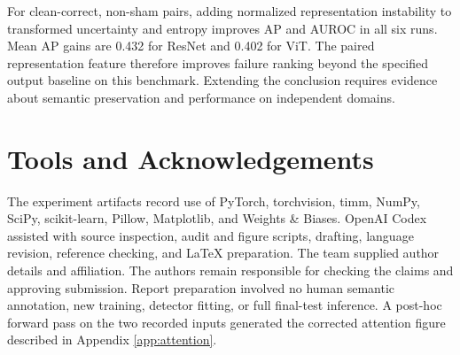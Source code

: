 For clean-correct, non-sham pairs, adding normalized representation instability to transformed uncertainty and entropy improves AP and AUROC in all six runs. Mean AP gains are 0.432 for ResNet and 0.402 for ViT. The paired representation feature therefore improves failure ranking beyond the specified output baseline on this benchmark. Extending the conclusion requires evidence about semantic preservation and performance on independent domains.

\section{Tools and Acknowledgements}

The experiment artifacts record use of PyTorch, torchvision, timm, NumPy, SciPy, scikit-learn, Pillow, Matplotlib, and Weights \& Biases. OpenAI Codex assisted with source inspection, audit and figure scripts, drafting, language revision, reference checking, and LaTeX preparation. The team supplied author details and affiliation. The authors remain responsible for checking the claims and approving submission. Report preparation involved no human semantic annotation, new training, detector fitting, or full final-test inference. A post-hoc forward pass on the two recorded inputs generated the corrected attention figure described in Appendix \ref{app:attention}.
